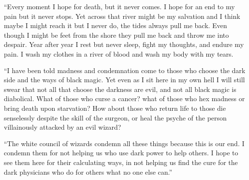 ``Every moment I hope for death, but it never comes. I hope for an end to my pain but it never stops. Yet across that river might be my salvation and I think maybe I might reach it but I never do, the tides always pull me back. Even though I might be feet from the shore they pull me back and throw me into despair. Year after year I rest but never sleep, fight my thoughts, and endure my pain. I wash my clothes in a river of blood and wash my body with my tears. 

``I have been told madness and condemnation come to those who choose the dark side and the ways of black magic. Yet even as I sit here in my own hell I will still swear that not all that choose the darkness are evil, and not all black magic is diabolical. What of those who curse a cancer? what of those who hex madness or bring death upon starvation? How about those who return life to those die senselessly despite the skill of the surgeon, or heal the psyche of the person villainously attacked by an evil wizard?

``The white council of wizards condemn all these things because this is our end. I condemn them for not helping us who use dark power to help others. I hope to see them here for their calculating ways, in not helping us find the cure for the dark physicians who do for others what no one else can.''






 
  
 
 























